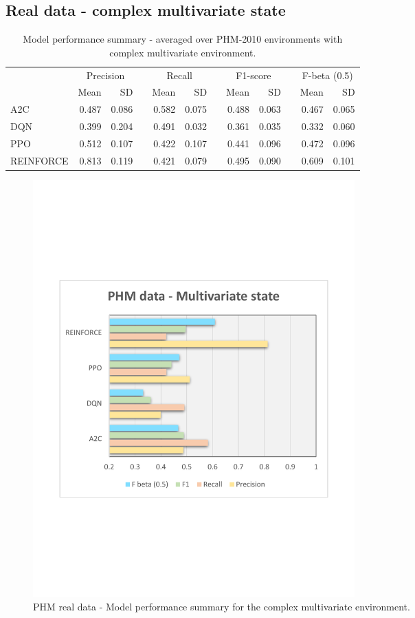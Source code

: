 \documentclass[a4paper, 12pt]{article}
\newcommand{\rowspace}[1]{\renewcommand{\arraystretch}{#1}}
\begin{document}
\subsection{Real data - complex multivariate state}
\begin{table}[!htb]\centering
	\sffamily
	\rowspace{1.3}
	\begin{tabular}{@{}l rr c rr c rr c rr@{}}
		\arrayrulecolor{black!40}\toprule
		& \multicolumn{2}{c}{Precision} & \phantom{i} & \multicolumn{2}{c}{Recall} & \phantom{i} & \multicolumn{2}{c}{F1-score} & \phantom{i} & \multicolumn{2}{c}{F-beta (0.5)} \\
		\cmidrule{2-3} \cmidrule{5-6} \cmidrule{8-9} \cmidrule{11-12} 
		
		&Mean &SD & &Mean &SD & &Mean &SD& &Mean & SD\\ \midrule
		A2C & 0.487 & 0.086 & &0.582 & 0.075 & & 0.488 & 0.063 & &0.467 &0.065 \\
		DQN & 0.399 & 0.204 & &0.491 & 0.032 & & 0.361 & 0.035 & &0.332 &0.060 \\
		PPO & 0.512 & 0.107 & &0.422 & 0.107 & & 0.441 & 0.096 & &0.472 &0.096 \\
		REINFORCE & 0.813 & 0.119 & &0.421 & 0.079 & & 0.495 & 0.090 & &0.609 &0.101 \\
		\bottomrule
	\end{tabular}
	\caption{Model performance summary - averaged over PHM-2010 environments with complex multivariate environment.}
	\label{tbl:PHMMS}
\end{table}
\begin{figure}[h]
	\centering
	\includegraphics[width=0.6\textwidth, trim={1.5cm 7cm 1cm 7cm}]{images/PHMMSPlot.pdf}  
	\caption{PHM real data - Model performance summary for the complex multivariate environment.}
	\label{fig:PHMMS}
\end{figure}
\end{document}
